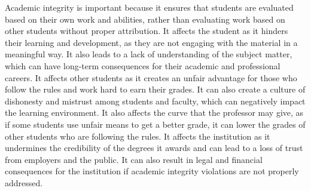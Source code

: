 \documentclass[notitlepage]{report}
\begin{document}
  Academic integrity is important because it ensures that students are
  evaluated based on their own work and abilities, rather than evaluating work
  based on other students without proper attribution. It affects the student as
  it hinders their learning and development, as they are not engaging with the
  material in a meaningful way. It also leads to a lack of understanding of the
  subject matter, which can have long-term consequences for their academic and
  professional careers. It affects other students as it creates an unfair
  advantage for those who follow the rules and work hard to earn their grades.
  It can also create a culture of dishonesty and mistrust among students and
  faculty, which can negatively impact the learning environment. It also
  affects the curve that the professor may give, as if some students use unfair
  means to get a better grade, it can lower the grades of other students who
  are following the rules. It affects the institution as it undermines the
  credibility of the degrees it awards and can lead to a loss of trust from
  employers and the public. It can also result in legal and financial
  consequences for the institution if academic integrity violations are not
  properly addressed.
\end{document}
